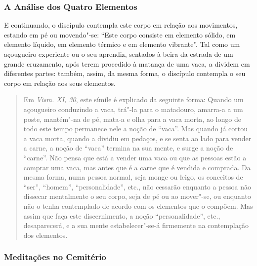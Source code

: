 \subsubsection{A Análise dos Quatro Elementos}


E continuando, o discípulo contempla este corpo em relação aos movimentos,
estando em pé ou movendo"-se: “Este corpo consiste em elemento sólido, em
elemento líquido, em elemento térmico e em elemento vibrante”. Tal como um
açougueiro experiente ou o seu aprendiz, sentados à beira da estrada de um
grande cruzamento, após terem procedido à matança de uma vaca, a dividem em
diferentes partes: também, assim, da mesma forma, o discípulo contempla o seu
corpo em relação aos seus elementos.


\begin{quote}
  Em \emph{Vism. XI, 30}, este símile é explicado da seguinte forma: Quando um
  açougueiro conduzindo a vaca, trá"-la para o matadouro, amarra-a a um poste,
  mantém"-na de pé, mata-a e olha para a vaca morta, ao longo de todo este tempo
  permanece nele a noção de “vaca”. Mas quando já cortou a vaca morta, quando
  a dividiu em pedaços, e se senta ao lado para vender a carne, a noção de
  “vaca” termina na sua mente, e surge a noção de “carne”. Não pensa que
  está a vender uma vaca ou que as pessoas estão a comprar uma vaca, mas antes
  que é a carne que é vendida e comprada. Da mesma forma, numa pessoa normal,
  seja monge ou leigo, os conceitos de “ser”, “homem”, “personalidade”,
  etc., não cessarão enquanto a pessoa não dissecar mentalmente o seu corpo,
  seja de pé ou ao mover"-se, ou enquanto não o tenha contemplado de acordo com
  os elementos que o compõem. Mas assim que faça este discernimento, a noção
  “personalidade”, etc., desaparecerá, e a sua mente estabelecer"-se-á
  firmemente na contemplação dos elementos.
\end{quote}

\subsubsection{Meditações no Cemitério}

